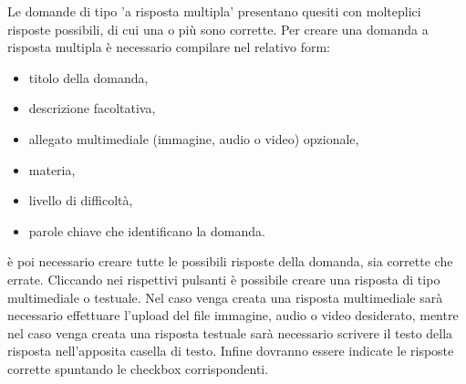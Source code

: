 \documentclass[a4paper, titlepage]{article}
\begin{document}
	 Le domande di tipo 'a risposta multipla' presentano quesiti con molteplici risposte possibili, di cui una o più sono corrette.
	 Per creare una domanda a risposta multipla è necessario compilare nel relativo form:
	 \begin{itemize}
	 	\item titolo della domanda,
	 	\item descrizione facoltativa,
	 	\item allegato multimediale (immagine, audio o video) opzionale,
	 	\item materia,
	 	\item livello di difficoltà,
	 	\item parole chiave che identificano la domanda.
	 \end{itemize}
	 è poi necessario creare tutte le possibili risposte della domanda, sia corrette che errate. Cliccando nei rispettivi pulsanti è possibile creare una risposta di tipo multimediale o testuale. Nel caso venga creata una risposta multimediale sarà necessario effettuare l'upload del file immagine, audio o video desiderato, mentre nel caso venga creata una risposta testuale sarà necessario scrivere il testo della risposta nell'apposita casella di testo.
	 Infine dovranno essere indicate le risposte corrette spuntando le checkbox corrispondenti.
	 
	 \newpage
\end{document}
